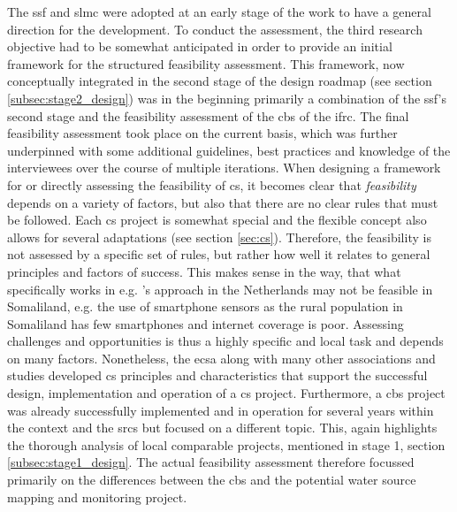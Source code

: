 The \acrlong{ssf} and \acrlong{slmc} were adopted at an early stage of the work to have a general direction for the development. To conduct the assessment, the third research objective had to be somewhat anticipated in order to provide an initial framework for the structured feasibility assessment. This framework, now conceptually integrated in the second stage of the design roadmap (see section \ref{subsec:stage2_design}) was in the beginning primarily a combination of the \acrshort{ssf}'s second stage and the feasibility assessment of the \acrshort{cbs} of the \acrshort{ifrc}. The final feasibility assessment took place on the current basis, which was further underpinned with some additional guidelines, best practices and knowledge of the interviewees over the course of multiple iterations.\newline
When designing a framework for or directly assessing the feasibility of \acrshort{cs}, it becomes clear that \textit{feasibility} depends on a variety of factors, but also that there are no clear rules that must be followed. Each \acrshort{cs} project is somewhat special and the flexible concept also allows for several adaptations (see section \ref{sec:cs}). Therefore, the feasibility is not assessed by a specific set of rules, but rather how well it relates to general principles and factors of success. This makes sense in the way, that what specifically works in e.g. \autocite{minkmanCitizenScienceWater2015}'s approach in the Netherlands may not be feasible in Somaliland, e.g. the use of smartphone sensors as the rural population in Somaliland has few smartphones and internet coverage is poor. Assessing challenges and opportunities is thus a highly specific and local task and depends on many factors.\newline
Nonetheless, the \acrshort{ecsa} along with many other associations and studies developed \acrshort{cs} principles and characteristics that support the successful design, implementation and operation of a \acrshort{cs} project. Furthermore, a \acrshort{cbs} project was already successfully implemented and in operation for several years within the context and the \acrshort{srcs} but focused on a different topic. This, again highlights the thorough analysis of local comparable projects, mentioned in stage 1, section \ref{subsec:stage1_design}. The actual feasibility assessment therefore focussed primarily on the differences between the \acrshort{cbs} and the potential water source mapping and monitoring project.\newline


